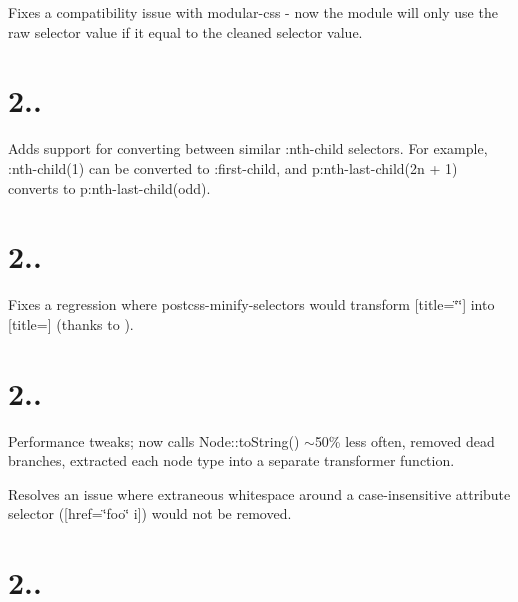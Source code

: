 
\begin{DoxyItemize}
\item Fixes a compatibility issue with {\ttfamily modular-\/css} -\/ now the module will only use the raw selector value if it equal to the \textquotesingle{}cleaned\textquotesingle{} selector value.
\end{DoxyItemize}

\section*{2..}


\begin{DoxyItemize}
\item Adds support for converting between similar {\ttfamily \+:nth-\/child} selectors. For example, {\ttfamily \+:nth-\/child(1)} can be converted to {\ttfamily \+:first-\/child}, and {\ttfamily p\+:nth-\/last-\/child(2n + 1)} converts to {\ttfamily p\+:nth-\/last-\/child(odd)}.
\end{DoxyItemize}

\section*{2..}


\begin{DoxyItemize}
\item Fixes a regression where postcss-\/minify-\/selectors would transform {\ttfamily \mbox{[}title=\char`\"{}\char`\"{}\mbox{]}} into {\ttfamily \mbox{[}title=\mbox{]}} (thanks to ).
\end{DoxyItemize}

\section*{2..}


\begin{DoxyItemize}
\item Performance tweaks; now calls {\ttfamily Node\+::to\+String()} $\sim$50\% less often, removed dead branches, extracted each node type into a separate transformer function.
\item Resolves an issue where extraneous whitespace around a case-\/insensitive attribute selector ({\ttfamily \mbox{[}href=\char`\"{}foo\char`\"{} i\mbox{]}}) would not be removed.
\end{DoxyItemize}

\section*{2..}


